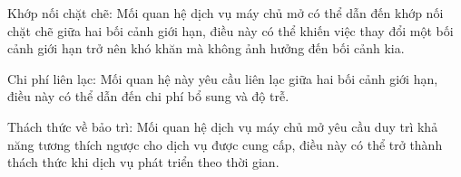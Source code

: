 Khớp nối chặt chẽ: Mối quan hệ dịch vụ máy chủ mở có thể dẫn đến khớp nối chặt chẽ giữa hai bối cảnh giới hạn, điều này có thể khiến việc thay đổi một bối cảnh giới hạn trở nên khó khăn mà không ảnh hưởng đến bối cảnh kia.

Chi phí liên lạc: Mối quan hệ này yêu cầu liên lạc giữa hai bối cảnh giới hạn, điều này có thể dẫn đến chi phí bổ sung và độ trễ.

Thách thức về bảo trì: Mối quan hệ dịch vụ máy chủ mở yêu cầu duy trì khả năng tương thích ngược cho dịch vụ được cung cấp, điều này có thể trở thành thách thức khi dịch vụ phát triển theo thời gian.






